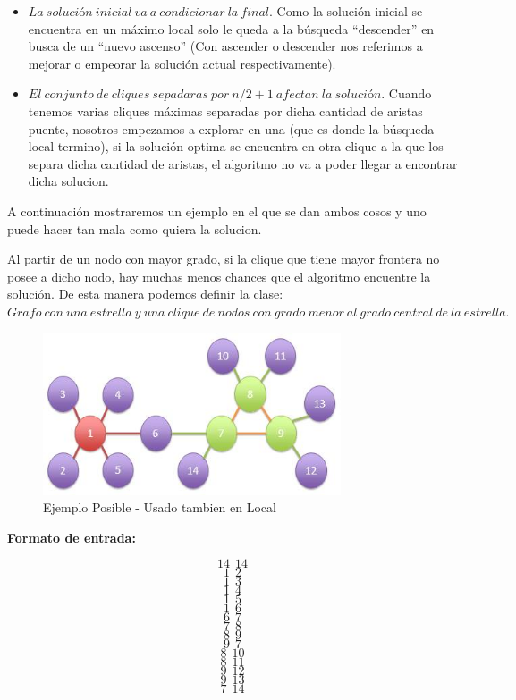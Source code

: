 \begin{itemize}
 
  \item $La\ solución\ inicial\ va\ a\ condicionar\ la\ final$. Como la solución inicial se encuentra en un máximo local solo le queda a la búsqueda ``descender'' en busca de un ``nuevo ascenso'' (Con ascender o descender nos referimos a mejorar o empeorar la solución actual respectivamente).


  \item $El\ conjunto\ de\ cliques\ sepadaras\ por\ n/2+1\ afectan\ la\ solución$. Cuando tenemos varias cliques máximas separadas por dicha cantidad de aristas puente, nosotros empezamos a explorar en una (que es donde la búsqueda local termino), si la solución optima se encuentra en otra clique a la que los separa dicha cantidad de aristas, el algoritmo no va a poder llegar a encontrar dicha solucion. 

\end{itemize}

A continuación mostraremos un ejemplo en el que se dan ambos cosos y uno puede hacer tan mala como quiera la solucion.

 Al partir de un nodo con mayor grado, si la clique que tiene mayor frontera no posee a dicho nodo, hay muchas menos chances que el algoritmo encuentre la solución. De esta manera podemos definir la clase:
 $Grafo\ con\ una\ estrella\ y\ una\ clique\ de\ nodos\ con\ grado\ menor\ al\ grado\ central\ de\ la\ estrella.$ 

\begin{figure}[H] %
\begin{center}
\includegraphics[width=250pt]{../imgs/ej1local.jpg}
\caption{Ejemplo Posible - Usado tambien en Local}
\end{center}
\end{figure}

\textbf{Formato de entrada:}

$$14\ \  14$$
$$1\ \  2$$
$$1\ \  3$$
$$1\ \  4$$
$$1\ \  5$$
$$1\ \  6$$
$$6\ \  7$$
$$7 \ \ 8$$
$$8\ \  9$$
$$9\ \  7$$
$$8\ \  10$$
$$8\ \  11$$
$$9\ \  12$$
$$9\ \  13$$
$$7\ \  14$$


